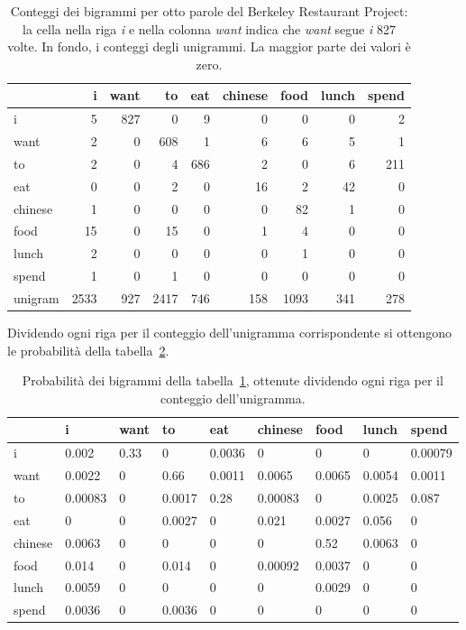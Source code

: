 \begin{table}[htbp]
\centering
\small
\begin{tabular}{l|rrrrrrrr}
\toprule
 & i & want & to & eat & chinese & food & lunch & spend \\
\midrule
i & 5 & 827 & 0 & 9 & 0 & 0 & 0 & 2 \\
want & 2 & 0 & 608 & 1 & 6 & 6 & 5 & 1 \\
to & 2 & 0 & 4 & 686 & 2 & 0 & 6 & 211 \\
eat & 0 & 0 & 2 & 0 & 16 & 2 & 42 & 0 \\
chinese & 1 & 0 & 0 & 0 & 0 & 82 & 1 & 0 \\
food & 15 & 0 & 15 & 0 & 1 & 4 & 0 & 0 \\
lunch & 2 & 0 & 0 & 0 & 0 & 1 & 0 & 0 \\
spend & 1 & 0 & 1 & 0 & 0 & 0 & 0 & 0 \\
\midrule
unigram & 2533 & 927 & 2417 & 746 & 158 & 1093 & 341 & 278 \\
\bottomrule
\end{tabular}
\caption{Conteggi dei bigrammi per otto parole del Berkeley Restaurant Project: la cella nella riga \textit{i} e nella colonna \textit{want} indica che \textit{want} segue \textit{i} 827 volte. In fondo, i conteggi degli unigrammi. La maggior parte dei valori è zero.}
\label{tab:berp-counts}
\end{table}

Dividendo ogni riga per il conteggio dell'unigramma corrispondente si ottengono le probabilità della tabella~\ref{tab:berp-probs}.

\begin{table}[htbp]
\centering
\small
\begin{tabular}{l|llllllll}
\toprule
 & i & want & to & eat & chinese & food & lunch & spend \\
\midrule
i & 0.002 & 0.33 & 0 & 0.0036 & 0 & 0 & 0 & 0.00079 \\
want & 0.0022 & 0 & 0.66 & 0.0011 & 0.0065 & 0.0065 & 0.0054 & 0.0011 \\
to & 0.00083 & 0 & 0.0017 & 0.28 & 0.00083 & 0 & 0.0025 & 0.087 \\
eat & 0 & 0 & 0.0027 & 0 & 0.021 & 0.0027 & 0.056 & 0 \\
chinese & 0.0063 & 0 & 0 & 0 & 0 & 0.52 & 0.0063 & 0 \\
food & 0.014 & 0 & 0.014 & 0 & 0.00092 & 0.0037 & 0 & 0 \\
lunch & 0.0059 & 0 & 0 & 0 & 0 & 0.0029 & 0 & 0 \\
spend & 0.0036 & 0 & 0.0036 & 0 & 0 & 0 & 0 & 0 \\
\bottomrule
\end{tabular}
\caption{Probabilità dei bigrammi della tabella~\ref{tab:berp-counts}, ottenute dividendo ogni riga per il conteggio dell'unigramma.}
\label{tab:berp-probs}
\end{table}

